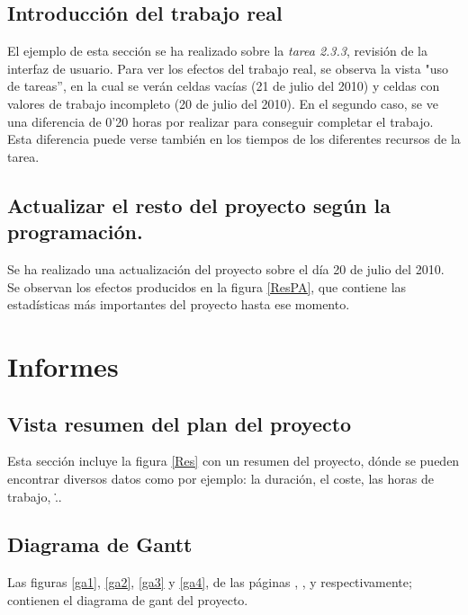 \documentclass[11pt,a4paper,spanish,twoside]{book}
\begin{document}
\section{Introducción del trabajo real}
El ejemplo de esta sección se ha realizado sobre la \emph{tarea 2.3.3}, 
revisión de la interfaz de usuario. Para ver los efectos del trabajo real, se 
observa la vista "uso de tareas'', en la cual se verán celdas vacías (21 de 
julio del 2010) y celdas con valores de trabajo incompleto (20 de julio del 
2010). En el segundo caso, se ve una diferencia de 0'20 horas por realizar para
conseguir completar el trabajo. Esta diferencia puede verse también en los 
tiempos de los diferentes recursos de la tarea.

\section{Actualizar el resto del proyecto según la programación.}
Se ha realizado una actualización del proyecto sobre el día 20 de julio del 
2010. Se observan los efectos producidos en la figura \ref{ResPA}, que contiene
las estadísticas más importantes del proyecto hasta ese momento.


\chapter{Informes}
\section{Vista resumen del plan del proyecto}
Esta sección incluye la figura \ref{Res} con un resumen del proyecto, dónde
se pueden encontrar diversos datos como por ejemplo: la duración, el coste,
las horas de trabajo, \...


\section{Diagrama de Gantt}
Las figuras \ref{ga1}, \ref{ga2}, \ref{ga3} y \ref{ga4}, de las páginas
\pageref{ga1}, \pageref{ga2}, \pageref{ga3} y \pageref{ga4} respectivamente;
contienen el diagrama de gant del proyecto.

\begin{sidewaystable}
\end{sidewaystable}
\end{document}
